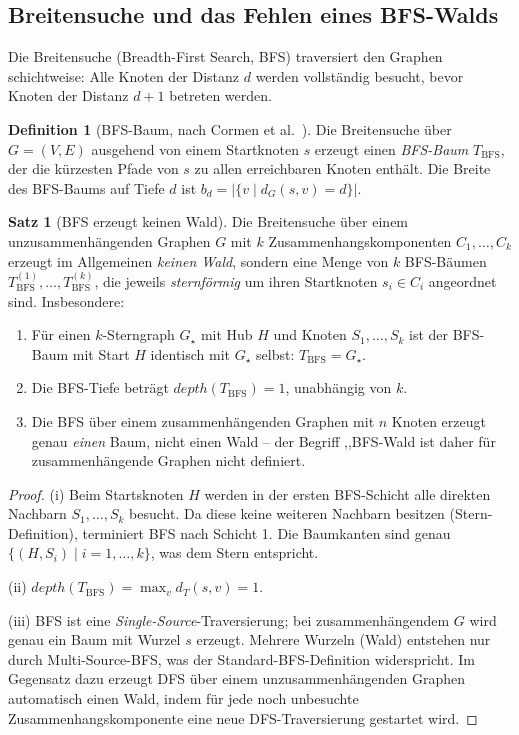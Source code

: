 ﻿\documentclass[12pt,a4paper]{article}
\theoremstyle{definition}
\newtheorem{definition}{Definition}[section]
\newtheorem{theorem}{Satz}[section]
\theoremstyle{remark}
\newcommand{\depth}{\mathit{depth}}
\begin{document}
\subsection{Breitensuche und das Fehlen eines BFS-Walds}

Die Breitensuche (Breadth-First Search, BFS) traversiert den Graphen
schichtweise: Alle Knoten der Distanz $d$ werden vollständig besucht, bevor
Knoten der Distanz $d+1$ betreten werden.

\begin{definition}[BFS-Baum, nach Cormen et al.~\cite{Cormen2009}]
\label{def:bfsbaum}
Die Breitensuche über $G = (V, E)$ ausgehend von einem Startknoten $s$
erzeugt einen \emph{BFS-Baum} $T_{\mathrm{BFS}}$, der die kürzesten Pfade
von $s$ zu allen erreichbaren Knoten enthält. Die Breite des BFS-Baums auf
Tiefe $d$ ist $b_d = |\{v \mid d_G(s,v) = d\}|$.
\end{definition}

\begin{theorem}[BFS erzeugt keinen Wald]
\label{thm:bfskeinwald}
Die Breitensuche über einem unzusammenhängenden Graphen $G$ mit $k$
Zusammenhangskomponenten $C_1, \ldots, C_k$ erzeugt im Allgemeinen
\emph{keinen Wald}, sondern eine Menge von $k$ BFS-Bäumen
$T_{\mathrm{BFS}}^{(1)}, \ldots, T_{\mathrm{BFS}}^{(k)}$, die jeweils
\emph{sternförmig} um ihren Startknoten $s_i \in C_i$ angeordnet sind.
Insbesondere:
\begin{enumerate}[label=(\roman*)]
  \item Für einen $k$-Stern\-graph $G_\star$ mit Hub $H$ und Knoten
        $S_1, \ldots, S_k$ ist der BFS-Baum mit Start $H$ identisch
        mit $G_\star$ selbst: $T_{\mathrm{BFS}} = G_\star$.
  \item Die BFS-Tiefe beträgt $\depth(T_{\mathrm{BFS}}) = 1$, unabhängig
        von $k$.
  \item Die BFS über einem zusammenhängenden Graphen mit $n$ Knoten
        erzeugt genau \emph{einen} Baum, nicht einen Wald -- der Begriff
        ,,BFS-Wald\grqq{} ist daher für zusammenhängende Graphen
        nicht definiert.
\end{enumerate}
\end{theorem}

\begin{proof}
(i) Beim Startsknoten $H$ werden in der ersten BFS-Schicht alle direkten
Nachbarn $S_1, \ldots, S_k$ besucht. Da diese keine weiteren Nachbarn
besitzen (Stern-Definition), terminiert BFS nach Schicht 1.
Die Baumkanten sind genau $\{(H, S_i) \mid i = 1, \ldots, k\}$, was dem
Stern entspricht.

(ii) $\depth(T_{\mathrm{BFS}}) = \max_{v} d_{T}(s, v) = 1$.

(iii) BFS ist eine \emph{Single-Source}-Traversierung; bei zusammenhängendem
$G$ wird genau ein Baum mit Wurzel $s$ erzeugt. Mehrere Wurzeln (Wald)
entstehen nur durch Multi-Source-BFS, was der Standard-BFS-Definition
widerspricht. Im Gegensatz dazu erzeugt DFS über einem unzusammenhängenden
Graphen automatisch einen Wald, indem für jede noch unbesuchte Zusammenhangskomponente
eine neue DFS-Traversierung gestartet wird.
\end{proof}
\end{document}
